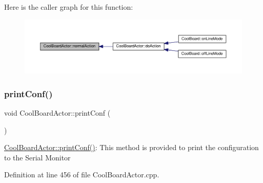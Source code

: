 Here is the caller graph for this function\+:
\nopagebreak
\begin{figure}[H]
\begin{center}
\leavevmode
\includegraphics[width=350pt]{dc/d69/class_cool_board_actor_a81229abf5895f4d3b0355050b822b438_icgraph}
\end{center}
\end{figure}
\mbox{\label{class_cool_board_actor_aabb10e7aebc3249ffc940530de29f84a}} 
\subsubsection{\texorpdfstring{print\+Conf()}{printConf()}}
{\footnotesize\ttfamily void Cool\+Board\+Actor\+::print\+Conf (\begin{DoxyParamCaption}{ }\end{DoxyParamCaption})}

\hyperlink{class_cool_board_actor_aabb10e7aebc3249ffc940530de29f84a}{Cool\+Board\+Actor\+::print\+Conf()}\+: This method is provided to print the configuration to the Serial Monitor 

Definition at line 456 of file Cool\+Board\+Actor.\+cpp.


